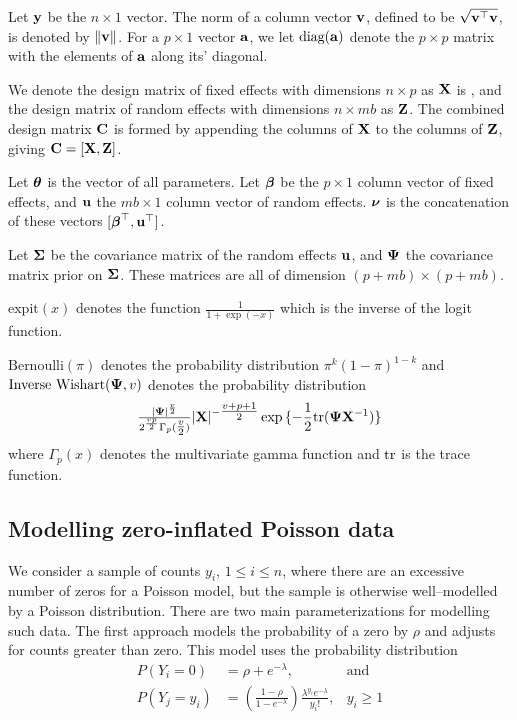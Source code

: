Let ${\bf y}$ be the $n \times 1$ vector. The norm of a column vector ${\bf v}$, defined to be $\sqrt{{\bf v}^\top {\bf v}}$,
is  denoted by $\|{\bf v}\|$. For a $p \times 1$ vector ${\bf a}$, we let $\text{diag}{({\bf a})}$ denote the $p \times p$
matrix with the elements of ${\bf a}$ along its' diagonal.

We denote the design matrix of fixed effects with dimensions $n \times p$ as ${\bf X}$ is , and the design matrix
of random  effects with dimensions $n \times m b$ as ${\bf Z}$. The combined design matrix ${\bf C}$ is formed by
appending the columns of ${\bf X}$ to the columns of ${\bf Z}$, giving ${\bf C} = [ {\bf X}, {\bf Z} ]$.

Let ${\boldsymbol \theta}$ is the vector of all parameters.
Let ${\boldsymbol \beta}$ be the $p \times 1$ column vector of fixed
effects, and ${\bf u}$ the $m b \times 1$ column vector of random effects. ${\boldsymbol \nu}$ is the
concatenation of these vectors $[{\boldsymbol \beta}^\top, {\bf u}^\top]$.

Let ${\boldsymbol \Sigma}$ be the covariance matrix of the random effects ${\bf u}$,
and 
${\boldsymbol \Psi}$ the covariance matrix prior on ${\boldsymbol \Sigma}$.
These matrices are all of dimension $(p + m b) \times (p + m b)$.


$\text{expit}(x)$ denotes the function $\tfrac{1}{1 + \exp(-x)}$ which is the inverse of the logit
function.

$\text{Bernoulli}(\pi)$ denotes the probability distribution $\pi^k (1 - \pi)^{1-k}$ and
$\text{Inverse Wishart}({\boldsymbol \Psi}, v)$ denotes the probability distribution
$$\tfrac{|{\boldsymbol \Psi}|^\frac{v}{2}}{2^{\frac{vp}{2}} \Gamma_p{(\tfrac{v}{2})}} |{\bf X}|^{-\tfrac{v + p + 1}{2}}
\exp{\{-\frac{1}{2} \text{tr}{({\boldsymbol\Psi}{\bf X}^{-1})}\}}$$ where $\Gamma_p{(x)}$ denotes the multivariate gamma function and $\text{tr}$
is the trace function.

\subsection{Modelling zero-inflated Poisson data}

We consider a sample of counts $y_i$, $1 \le i\le n$, where there are an excessive number of zeros for a
Poisson model, but the sample is otherwise well--modelled by a Poisson distribution. There are two main
parameterizations for modelling such data. The first approach models the probability of a zero by $\rho$ and
adjusts for counts greater than zero. This model uses the probability distribution
$$
\begin{array}{rll}
	P(Y_i = 0) &= \rho + e^{-\lambda}, &\mbox{and} \\
	P(Y_j = y_i) &= \left( \frac{1 - \rho}{1 - e^{-\lambda}} \right) \frac{\lambda^{y_i} e^{-\lambda}} {y_i!}, &y_i \ge 1
\end{array}
$$


